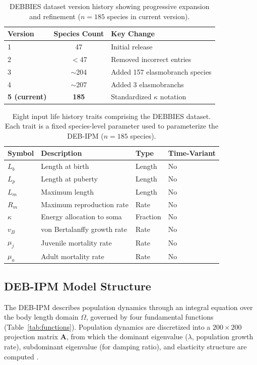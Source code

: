 \documentclass[11pt]{article}
\begin{document}
\begin{table}[H]
\centering
\caption{DEBBIES dataset version history showing progressive expansion and refinement ($n = 185$ species in current version).}
\label{tab:versions}
\begin{tabular}{lcl}
\toprule
\textbf{Version} & \textbf{Species Count} & \textbf{Key Change} \\
\midrule
1 & 47 & Initial release \\
2 & $<$47 & Removed incorrect entries \\
3 & $\sim$204 & Added 157 elasmobranch species \\
4 & $\sim$207 & Added 3 elasmobranchs \\
\textbf{5 (current)} & \textbf{185} & Standardized $\kappa$ notation \\
\bottomrule
\end{tabular}
\end{table}

\begin{table}[H]
\centering
\caption{Eight input life history traits comprising the DEBBIES dataset. Each trait is a fixed species-level parameter used to parameterize the DEB-IPM ($n = 185$ species).}
\label{tab:traits}
\begin{tabular}{llll}
\toprule
\textbf{Symbol} & \textbf{Description} & \textbf{Type} & \textbf{Time-Variant} \\
\midrule
$L_b$ & Length at birth & Length & No \\
$L_p$ & Length at puberty & Length & No \\
$L_m$ & Maximum length & Length & No \\
$R_m$ & Maximum reproduction rate & Rate & No \\
$\kappa$ & Energy allocation to soma & Fraction & No \\
$v_B$ & von Bertalanffy growth rate & Rate & No \\
$\mu_j$ & Juvenile mortality rate & Rate & No \\
$\mu_a$ & Adult mortality rate & Rate & No \\
\bottomrule
\end{tabular}
\end{table}

\subsection{DEB-IPM Model Structure}

The DEB-IPM describes population dynamics through an integral equation over the body length domain $\Omega$, governed by four fundamental functions (Table~\ref{tab:functions}). Population dynamics are discretized into a $200 \times 200$ projection matrix $\mathbf{A}$, from which the dominant eigenvalue ($\lambda$, population growth rate), subdominant eigenvalue (for damping ratio), and elasticity structure are computed \citep{caswell2001matrix}.
\end{document}
